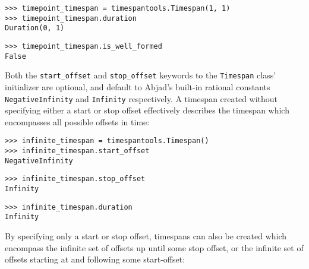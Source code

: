 \begin{singlespacing}
\vspace{-0.5\baselineskip}
\begin{lstlisting}
>>> timepoint_timespan = timespantools.Timespan(1, 1)
>>> timepoint_timespan.duration
Duration(0, 1)
\end{lstlisting}
\begin{lstlisting}
>>> timepoint_timespan.is_well_formed
False
\end{lstlisting}
\end{singlespacing}

\noindent Both the \texttt{start\_offset} and \texttt{stop\_offset} keywords to
the \texttt{Timespan} class' initializer are optional, and default to Abjad's
built-in rational constants \texttt{NegativeInfinity} and \texttt{Infinity}
respectively. A timespan created without specifying either a start or stop
offset effectively describes the timespan which encompasses all possible
offsets in time:

\begin{comment}
<abjad>
infinite_timespan = timespantools.Timespan()
infinite_timespan.start_offset
infinite_timespan.stop_offset
infinite_timespan.duration
</abjad>
\end{comment}

\begin{singlespacing}
\vspace{-0.5\baselineskip}
\begin{lstlisting}
>>> infinite_timespan = timespantools.Timespan()
>>> infinite_timespan.start_offset
NegativeInfinity
\end{lstlisting}
\begin{lstlisting}
>>> infinite_timespan.stop_offset
Infinity
\end{lstlisting}
\begin{lstlisting}
>>> infinite_timespan.duration
Infinity
\end{lstlisting}
\end{singlespacing}

\noindent By specifying only a start or stop offset, timespans can also be
created which encompass the infinite set of offsets up until some stop offset,
or the infinite set of offsets starting at and following some start-offset:

\begin{comment}
<abjad>
timespantools.Timespan(stop_offset=0)
timespantools.Timespan(start_offset=0)
</abjad>
\end{comment}

